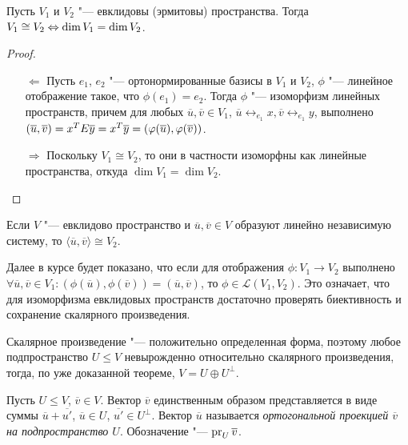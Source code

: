 \begin{theorem}
	Пусть $V_1$ и $V_2$ "--- евклидовы (эрмитовы) пространства. Тогда $V_1 \cong V_2 \hm\lra \dim{V_1} = \dim{V_2}$.
\end{theorem}

\begin{proof}~
	\begin{itemize}
		\item[$\Leftarrow$]Пусть $e_1$, $e_2$ "--- ортонормированные базисы в $V_1$ и $V_2$, $\phi$ "--- линейное отображение такое, что $\phi(e_1) = e_2$. Тогда $\phi$ "--- изоморфизм линейных пространств, причем для любых $\overline{u}, \overline{v} \in V_1$, $\overline{u} \leftrightarrow_{e_1} x, \overline{v} \leftrightarrow_{e_1} y$, выполнено $(\overline{u}, \overline{v}) = x^TE\overline{y} \hm{=} x^T\overline{y} = (\phi(\overline{u}), \phi(\overline{v}))$.
		\item[$\Rightarrow$]Поскольку $V_1 \cong V_2$, то они в частности изоморфны как линейные пространства, откуда $\dim{V_1} = \dim{V_2}$.\qedhere
	\end{itemize}
\end{proof}

\begin{note}
	Если $V$ "--- евклидово пространство и $\overline{u}, \overline{v} \in V$ образуют линейно независимую систему, то $\langle\overline{u}, \overline{v}\rangle \cong V_2$.
\end{note}

\begin{note}
	Далее в курсе будет показано, что если для отображения $\phi: V_1 \rightarrow V_2$ выполнено $\forall \overline{u}, \overline{v} \in V_1: (\phi(\overline{u}), \phi(\overline{v})) = (\overline{u}, \overline{v})$, то $\phi \in \mathcal{L}(V_1, V_2)$. Это означает, что для изоморфизма евклидовых пространств достаточно проверять биективность и сохранение скалярного произведения.
\end{note}

\begin{note}
	Скалярное произведение "--- положительно определенная форма, поэтому любое подпространство $U \le V$ невырожденно относительно скалярного произведения, тогда, по уже доказанной теореме, $V = U \oplus U^\perp$.
\end{note}

\begin{definition}
	Пусть $U \le V$, $\overline{v} \in V$. Вектор $\overline{v}$ единственным образом представляется в виде суммы $\overline{u} + \overline{u'}$, $\overline{u} \in U$, $\overline{u'} \in U^\perp$. Вектор $\overline{u}$ называется \textit{ортогональной проекцией $\overline{v}$ на подпространство $U$}. Обозначение "--- $\operatorname{pr}_U{\overline{v}}$.
\end{definition}

